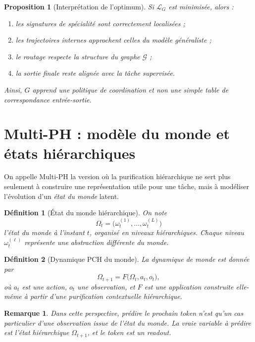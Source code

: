 \documentclass[11pt,a4paper]{article}
\newtheorem{definition}{Définition}[section]
\newtheorem{proposition}{Proposition}[section]
\newtheorem{remark}{Remarque}[section]
\newcommand{\Gcal}{\mathcal G}
\newcommand{\1}{\mathbf 1}
\begin{document}
\begin{proposition}[Interprétation de l'optimum]
Si \(\mathcal L_G\) est minimisée, alors :
\begin{enumerate}[leftmargin=2em]
    \item les signatures de spécialité sont correctement localisées ;
    \item les trajectoires internes approchent celles du modèle généraliste ;
    \item le routage respecte la structure du graphe \(\Gcal\) ;
    \item la sortie finale reste alignée avec la tâche supervisée.
\end{enumerate}
Ainsi, \(G\) apprend une politique de coordination et non une simple table de correspondance entrée-sortie.
\end{proposition}

\section{Multi-PH : modèle du monde et états hiérarchiques}

On appelle Multi-PH la version où la purification hiérarchique ne sert plus seulement à construire une représentation utile pour une tâche, mais à modéliser l'évolution d'un \emph{état du monde} latent.

\begin{definition}[État du monde hiérarchique]
On note
\[
\Omega_t = \bigl(\omega_t^{(1)},\dots,\omega_t^{(L)}\bigr)
\]
l'état du monde à l'instant \(t\), organisé en niveaux hiérarchiques.
Chaque niveau \(\omega_t^{(\ell)}\) représente une abstraction différente du monde.
\end{definition}

\begin{definition}[Dynamique PCH du monde]
La dynamique de monde est donnée par
\[
\Omega_{t+1}
=
F\!\bigl(\Omega_t,a_t,o_t\bigr),
\]
où \(a_t\) est une action, \(o_t\) une observation, et \(F\) est une application construite elle-même à partir d'une purification contextuelle hiérarchique.
\end{definition}

\begin{remark}
Dans cette perspective, prédire le prochain token n'est qu'un cas particulier d'une observation issue de l'état du monde.
La vraie variable à prédire est l'état hiérarchique \(\Omega_{t+1}\), et le token est un readout.
\end{remark}
\end{document}
